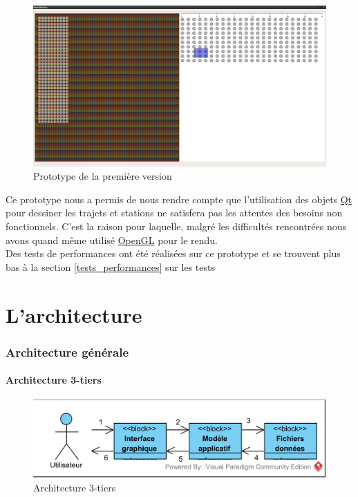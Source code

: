 \documentclass[12pt]{article}
\begin{document}
	\begin{figure}[!h]
	\begin{center}
	\includegraphics[scale=0.2]{prototype1_screen_shot.png}
	\caption{Prototype de la première version}
	\end{center}
	\end{figure}		
	
	Ce prototype nous a permis de nous rendre compte que l’utilisation des objets
	\href{https://www.qt.io/}{Qt} pour dessiner les trajets et stations
	ne satisfera pas les attentes des besoins non fonctionnels. C’est la raison pour
	laquelle, malgré les difficultés rencontrées nous avons quand même utilisé
	\href{https://www.khronos.org/registry/OpenGL-Refpages/gl4/}{OpenGL}
	pour le rendu.\\
	
	Des tests de performances ont été réalisées sur ce prototype et se trouvent plus bas à la
	section \ref{tests_performances} sur les tests\.\\

\newpage
\part{L'architecture}

	\section{Architecture générale}
		\subsection{Architecture 3-tiers}
		\begin{figure}[!h]
		\begin{center}
		\includegraphics[scale=1]{dia_block_3tiers.png}
		\caption{Architecture 3-tiers}
		\end{center}
		\end{figure}
		
\end{document}
